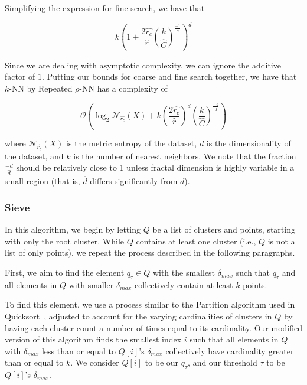 Simplifying the expression for fine search, we have that

\begin{equation*}
    k\left(1+ \frac{2\hat{r_c}}{\hat{r}}\left(\frac{k}{\hat{C}}\right)^{\frac{-1}{\hat{d}}}\right)^d
\end{equation*}

Since we are dealing with asymptotic complexity, we can ignore the additive factor of $1$.
Putting our bounds for coarse and fine search together, we have that $k$-NN by Repeated $\rho$-NN has a complexity of

\begin{equation}
    \mathcal{O}\left(\log_2{\mathcal{N}_{\hat{r_c}}(X)} + k\left(\frac{2\hat{r_c}}{\hat{r}}\right)^d\left(\frac{k}{\hat{C}}\right)^{\frac{-d}{\hat{d}}}\right)
    \label{eq:methods:knn-by-rnn-complexity}
\end{equation}

where $\mathcal{N}_{\hat{r_c}}(X)$ is the metric entropy of the dataset, $d$ is the dimensionality of the dataset, and $k$ is the number of nearest neighbors.
We note that the fraction $\frac{-d}{\hat{d}}$ should be relatively close to 1 unless fractal dimension is highly variable in a small region (that is, $\hat{d}$ differs significantly from $d$).


\subsubsection{Sieve}
\label{subsubsec:methods:knn-search:sieve}

In this algorithm, we begin by letting $Q$ be a list of clusters and points, starting with only the root cluster. 
While $Q$ contains at least one cluster (i.e., $Q$ is not a list of only points), we repeat the process described in 
the following paragraphs. 

First, we aim to find the element $q_{\tau} \in Q$ with the smallest $\delta_{max}$ such that 
$q_{\tau}$ and all elements in $Q$ with smaller $\delta_{max}$ collectively contain at least $k$ points. 

To find this element, we use a process similar to the Partition algorithm used in Quicksort~\cite{10.1093/comjnl/5.1.10}, adjusted to account for the varying cardinalities of clusters in $Q$ by having each cluster count a number of times equal to its cardinality.
Our modified version of this algorithm finds the smallest index $i$ such that all elements in $Q$ with $\delta_{max}$ less than or equal to $Q[i]$'s $\delta_{max}$ collectively have cardinality greater than or equal to $k$.
We consider $Q[i]$ to be our $q_{\tau}$, and our threshold $\tau$ to be $Q[i]$'s $\delta_{max}$.

